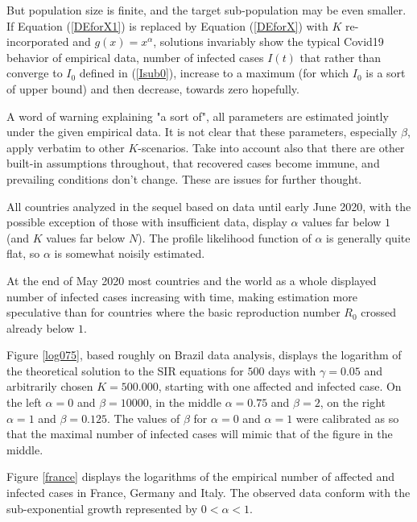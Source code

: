 \documentclass{article}
\begin{document}
\bigskip

But population size is finite, and the target sub-population may be even smaller. If Equation (\ref{DEforX1}) is replaced by Equation (\ref{DEforX}) with $K$ re-incorporated and $g(x)=x^\alpha$, solutions invariably show the typical Covid19 behavior of empirical data, number of infected cases $I(t)$ that rather than converge to $I_0$ defined in (\ref{Isub0}), increase to a maximum (for which $I_0$ is a sort of upper bound) and then decrease, towards zero hopefully.

A word of warning explaining "a sort of", all parameters are estimated jointly under the given empirical data. It is not clear that these parameters, especially $\beta$, apply verbatim to other \linebreak $K$-scenarios. Take into account also that there are other built-in assumptions throughout, that recovered cases become immune, and prevailing conditions don't change. These are issues for further thought.

All countries analyzed in the sequel based on data until early June 2020, with the possible exception of those with insufficient data, display $\alpha$ values far below $1$ (and $K$ values far below $N$). The profile likelihood \cite{Murphy} function of $\alpha$ is generally quite flat, so $\alpha$ is somewhat noisily estimated.

At the end of May 2020 most countries and the world as a whole displayed number of infected cases increasing with time, making estimation more speculative than for countries where the basic reproduction number $R_0$ crossed already below $1$.

\bigskip

Figure \ref{log075}, based roughly on Brazil data analysis, displays the logarithm of the theoretical solution to the SIR equations for $500$ days with $\gamma=0.05$ and arbitrarily chosen $K=500.000$, starting with one affected and infected case. On the left $\alpha=0$ and $\beta=10000$, in the middle $\alpha=0.75$ and $\beta=2$, on the right $\alpha=1$ and $\beta=0.125$. The values of $\beta$ for $\alpha=0$ and $\alpha=1$ were calibrated as so that the maximal number of infected cases will mimic that of the figure in the middle.

Figure \ref{france} displays the logarithms of the empirical number of affected and infected cases in France, Germany and Italy. The observed data conform with the sub-exponential growth represented by $0<\alpha<1$.
\end{document}
